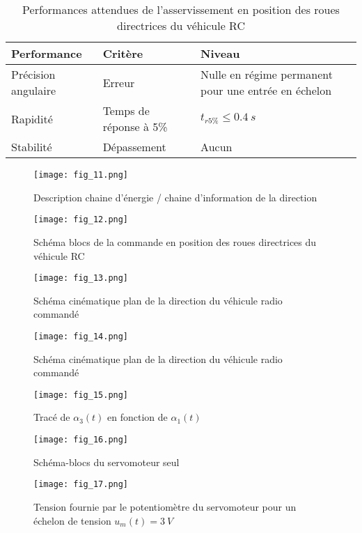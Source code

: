 \begin{table}[H]
\centering
\begin{tabular}{lll}
\hline
Performance &Critère& Niveau \\
\hline 
Précision angulaire & Erreur &Nulle en régime permanent pour une entrée en échelon \\
Rapidité &Temps de réponse à 5\% & $t_{r5\%}\leq \SI{0,4}{s}$ \\
Stabilité &Dépassement &Aucun \\ \hline
\end{tabular}
\caption{Performances attendues de l’asservissement en position des roues directrices du véhicule RC
 \label{tab_02}}
\end{table}


\begin{figure}[H]
\centering
\texttt{[image: fig\_11.png]}
\caption{Description chaine d’énergie / chaine d’information de la direction \label{fig_11}}
\end{figure}


\begin{figure}[H]
\centering
\texttt{[image: fig\_12.png]}
\caption{Schéma blocs de la commande en position des roues directrices du véhicule RC \label{fig_12}}
\end{figure}


\begin{figure}[H]
\centering
\texttt{[image: fig\_13.png]}
\caption{Schéma cinématique plan de la direction du véhicule radio commandé \label{fig_13}}
\end{figure}


\begin{figure}[H]
\centering
\texttt{[image: fig\_14.png]}
\caption{Schéma cinématique plan de la direction du véhicule radio commandé \label{fig_14}}
\end{figure}


\begin{figure}[H]
\centering
\texttt{[image: fig\_15.png]}
\caption{Tracé de $\alpha_3(t)$ en fonction de $\alpha_1(t)$ \label{fig_15}}
\end{figure}


\begin{figure}[H]
\centering
\texttt{[image: fig\_16.png]}
\caption{Schéma-blocs du servomoteur seul \label{fig_16}}
\end{figure}


\begin{figure}[H]
\centering
\texttt{[image: fig\_17.png]}
\caption{Tension fournie par le potentiomètre du servomoteur pour un échelon de tension $u_m(t)=\SI{3}{V}$ \label{fig_17}}
\end{figure}


